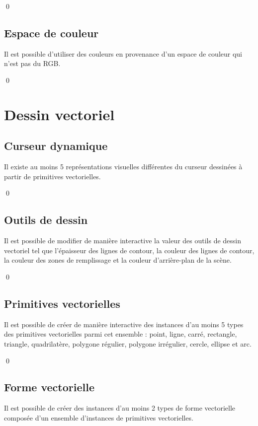\documentclass[12pt]{article}
\newcommand{\state}{\noindent}
\begin{document}
\qed

\subsection{Espace de couleur}

\state
Il est possible d'utiliser des couleurs en provenance d'un espace de couleur qui n'est pas du RGB.

\qed

\pagebreak

\section{Dessin vectoriel}

\subsection{Curseur dynamique}

\state
Il existe au moins 5 représentations visuelles différentes du curseur dessinées à partir de primitives vectorielles.

\qed

\subsection{Outils de dessin}

\state
Il est possible de modifier de manière interactive la valeur des outils de dessin vectoriel tel que l'épaisseur des lignes de contour, la couleur des lignes de contour, la couleur des zones de remplissage et la couleur d'arrière-plan de la scène.

\qed

\subsection{Primitives vectorielles}

\state
Il est possible de créer de manière interactive des instances d'au moins 5 types des primitives vectorielles parmi cet ensemble : point, ligne, carré, rectangle, triangle, quadrilatère, polygone régulier, polygone irrégulier, cercle, ellipse et arc.

\qed

\subsection{Forme vectorielle}

\state
Il est possible de créer des instances d'au moins 2 types de forme vectorielle composée d'un ensemble d'instances de primitives vectorielles.
\end{document}
